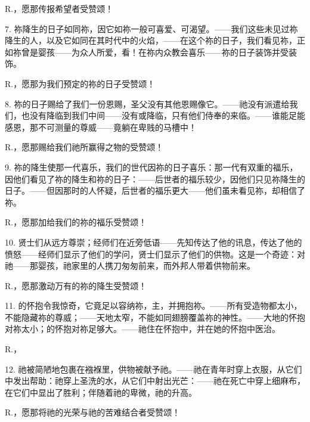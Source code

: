 R.，愿那传报希望者受赞颂！\par

7. 祢降生的日子如同祢，因它如祢一般可喜爱、可渴望。——我们这些未见过祢降生的人，以及它如同在其时代中的火焰，——在这个祢的日子，我们看见祢，正如祢曾是婴孩——为众人所爱，看！在祢内众教会喜乐——祢的日子装饰并受装饰。\par

R.，愿那为我们预定的祢的日子受赞颂！\par

8. 祢的日子赐给了我们一份恩赐，圣父没有其他恩赐像它。——祂没有派遣给我们，也没有降临到我们中间——没有或降临，只有他们侍奉的来临。——谁能足能感恩，那不可测量的尊威——竟躺在卑贱的马槽中！\par

R.，愿那赐给我们祂所赢得之物的受赞颂！\par

9. 祢的降生使那一代喜乐，我们的世代因祢的日子喜乐：那一代有双重的福乐，因他们看见了祢的降生和祢的日子：——后世者的福乐较少，因他们只见祢降生的日子。——但因那时的人怀疑，后世者的福乐更大——他们虽未看见祢，却相信了祢。\par

R.，愿那加给我们的祢的福乐受赞颂！\par

10. 贤士们从远方尊崇；经师们在近旁低语——先知传达了他的讯息，传达了他的愤怒——经师们显示了他们的学问，贤士们显示了他们的供物。这是一个奇迹：对祂——那婴孩，祂家里的人携刀匆匆前来，而外邦人带着供物前来。\par

R.，愿那激动万有的祢的降生受赞颂！\par

11. 的怀抱令我惊奇，它竟足以容纳祢，主，并拥抱祢。——所有受造物都太小，不能隐藏祢的尊威；——天地太窄，不能如同翅膀覆盖祢的神性。——大地的怀抱对祢太小；的怀抱对祢足够大。——祂住在怀抱中，并在她的怀抱中医治。\par

R.，\par

12. 祂被简陋地包裹在襁褓里，供物被献予祂。——祂在青年时穿上衣服，从它们中发出帮助：祂穿上圣洗的水，从它们中射出光芒：——祂在死亡中穿上细麻布，在它们中显出了胜利；伴随着祂的卑微，祂的升高。\par

R.，愿那将祂的光荣与祂的苦难结合者受赞颂！\par

